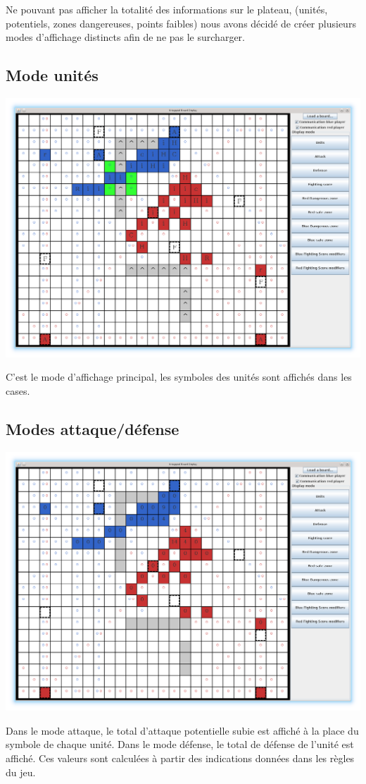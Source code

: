 		Ne pouvant pas afficher la totalité des informations sur le plateau, (unités, potentiels, zones dangereuses, points faibles) nous
		avons décidé de créer plusieurs modes d'affichage distincts afin de ne pas le surcharger.

		\subsection{Mode unités}

			\centerline{\includegraphics[scale=0.5]{images/screen_units.png}}
			C'est le mode d'affichage principal, les symboles des unités sont affichés dans les cases.
			\clearpage

		\subsection{Modes attaque/défense}

			\centerline{\includegraphics[scale=0.5]{images/screen_def.png}}
			Dans le mode attaque, le total d'attaque potentielle subie est affiché à la place du symbole de chaque unité.
			Dans le mode défense, le total de défense de l'unité est affiché.
			Ces valeurs sont calculées à partir des indications données dans les règles du jeu.
			\clearpage	

